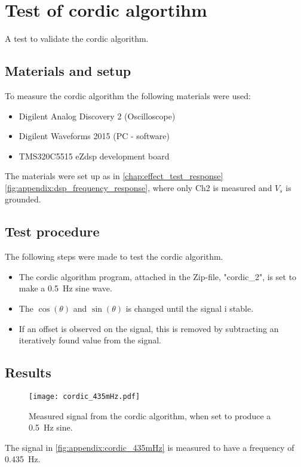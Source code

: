 \chapter{Test of \gls{cordic} algortihm}\label{app:cordic_shape}
A test to validate the \gls{cordic} algorithm.

\section*{Materials and setup}
To measure the \gls{cordic} algorithm the following materials were used:
\begin{itemize}
\item Digilent Analog Discovery 2 (Oscilloscope)
\item Digilent Waveforms 2015 (PC - software)
\item TMS320C5515 eZdsp development board
\end{itemize}

The materials were set up as in \autoref{chap:effect_test_response} \autoref{fig:appendix:dsp_frequency_response}, where only Ch2 is measured and $V_s$ is grounded.

\section*{Test procedure}
The following steps were made to test the \gls{cordic} algorithm.
\begin{itemize}
\item The \gls{cordic} algorithm program, attached in the Zip-file, "cordic_2", is set to make a \SI{0.5}{\hertz} sine wave.
\item The $\cos(\theta)$ and $\sin(\theta)$ is changed until the signal i stable.
\item If an offset is observed on the signal, this is removed by subtracting an iteratively found value from the signal.
\end{itemize} 

\section*{Results} 

\begin{figure}[htbp!]
	\centering
		\texttt{[image: cordic\_435mHz.pdf]}
		\caption{Measured signal from the \gls{cordic} algorithm, when set to produce a \SI{0.5}{\hertz} sine.}
		\label{fig:appendix:cordic_435mHz}
\end{figure}

The signal in \autoref{fig:appendix:cordic_435mHz} is measured to have a frequency of \SI{0.435}{\hertz}.